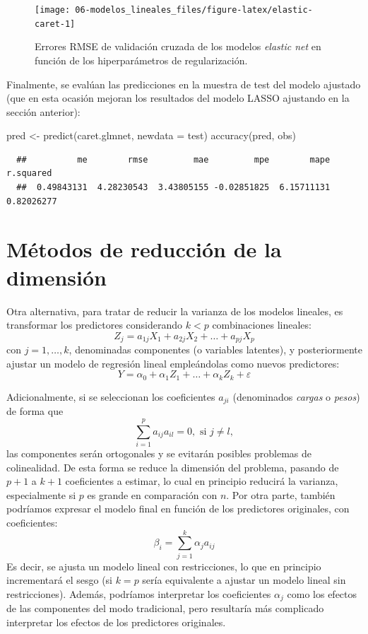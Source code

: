 \documentclass[
]{book}
\newenvironment{Shaded}{\begin{snugshade}}{\end{snugshade}}
\newcommand{\AttributeTok}[1]{\textcolor[rgb]{0.77,0.63,0.00}{#1}}
\newcommand{\FunctionTok}[1]{\textcolor[rgb]{0.00,0.00,0.00}{#1}}
\newcommand{\NormalTok}[1]{#1}
\newcommand{\OtherTok}[1]{\textcolor[rgb]{0.56,0.35,0.01}{#1}}
\theoremstyle{break}
\theoremstyle{nonumberplain}
\begin{document}
\begin{figure}[!htb]

{\centering \texttt{[image: 06-modelos\_lineales\_files/figure-latex/elastic-caret-1]} 

}

\caption{Errores RMSE de validación cruzada de los modelos \emph{elastic net} en función de los hiperparámetros de regularización.}\label{fig:elastic-caret}
\end{figure}

Finalmente, se evalúan las predicciones en la muestra de test del modelo ajustado (que en esta ocasión mejoran los resultados del modelo LASSO ajustando en la sección anterior):

\begin{Shaded}
\begin{Highlighting}[]
\NormalTok{pred }\OtherTok{\textless{}{-}} \FunctionTok{predict}\NormalTok{(caret.glmnet, }\AttributeTok{newdata =}\NormalTok{ test)}
\FunctionTok{accuracy}\NormalTok{(pred, obs)}
\end{Highlighting}
\end{Shaded}

\begin{verbatim}
  ##          me        rmse         mae         mpe        mape   r.squared 
  ##  0.49843131  4.28230543  3.43805155 -0.02851825  6.15711131  0.82026277
\end{verbatim}

\hypertarget{pca-pls}{%
\section{Métodos de reducción de la dimensión}\label{pca-pls}}

Otra alternativa, para tratar de reducir la varianza de los modelos lineales, es transformar los predictores considerando \(k < p\) combinaciones lineales:
\[Z_j = a_{1j}X_{1} + a_{2j}X_{2} + \ldots + a_{pj}X_{p}\]
con \(j = 1, \ldots, k\), denominadas componentes (o variables latentes),
y posteriormente ajustar un modelo de regresión lineal empleándolas como nuevos predictores:
\[Y = \alpha_0 + \alpha_1 Z_1 + \ldots + \alpha_k Z_k + \varepsilon\]

Adicionalmente, si se seleccionan los coeficientes \(a_{ji}\) (denominados \emph{cargas} o \emph{pesos}) de forma que
\[\sum_{i=1}^p a_{ij}a_{il} = 0, \text{ si } j \neq l,\]
las componentes serán ortogonales y se evitarán posibles problemas de colinealidad.
De esta forma se reduce la dimensión del problema, pasando de \(p + 1\) a \(k + 1\) coeficientes a estimar, lo cual en principio reducirá la varianza, especialmente si \(p\) es grande en comparación con \(n\).
Por otra parte, también podríamos expresar el modelo final en función de los predictores originales, con coeficientes:
\[\beta_i = \sum_{j=1}^k \alpha_j a_{ij}\]
Es decir, se ajusta un modelo lineal con restricciones, lo que en principio incrementará el sesgo (si \(k = p\) sería equivalente a ajustar un modelo lineal sin restricciones).
Además, podríamos interpretar los coeficientes \(\alpha_j\) como los efectos de las componentes del modo tradicional, pero resultaría más complicado interpretar los efectos de los predictores originales.
\end{document}
